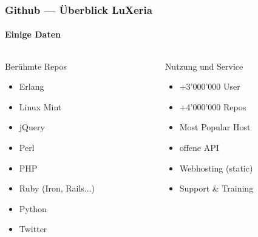 \begin{frame}
    \frametitle{Github --- Überblick \hfill{} LuXeria}
    \framesubtitle{Einige Daten}
    \begin{columns}
        \begin{column}{5cm}
            \begin{block}{Berühmte Repos}
                \begin{itemize}
                    \item Erlang
                    \item Linux Mint
                    \item jQuery
                    \item Perl
                    \item PHP
                    \item Ruby (Iron, Rails...)
                    \item Python
                    \item Twitter
                \end{itemize}
            \end{block}
        \end{column}
        \begin{column}{5cm}
            \begin{block}{Nutzung und Service}
                \begin{itemize}
                    \item +3'000'000 User
                    \item +4'000'000 Repos
                    \item Most Popular Host
                    \item offene API
                    \item Webhosting (static)
                    \item Support \& Training
                \end{itemize}
            \end{block}
        \end{column}
    \end{columns}
\end{frame}


